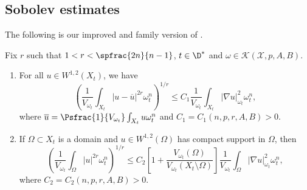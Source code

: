 \subsection{Sobolev estimates} \label{sec:sobolev}

The following is our improved and family version of \cite[Th.\,2.1 \& Lem.\,6.2]{GPSS23}.

\begin{theorem} \label{thm:sobolev}
Fix $r$ such that $1<r< \spfrac{2n}{n-1}$, $t \in \D^*$ and $\omega \in {\mathcal K}(\mathcal{X},p,A,B)$.
\begin{enumerate}
\item
For all $u\in W^{1,2}(X_t)$, we have
\[
\left(\frac{1}{V_{\omega_t}} \int_{X_t} |u-\overline{u}|^{2r}\omega_t^n\right)^{1/r}
\leq C_1\frac{1}{V_{\omega_t}} \int_{X_t} |\nabla u|^2_{\omega_t} \omega_t^n,
\]
where $\overline u= \Psfrac{1}{V_{\omega_t}}\int_{X_t} u \omega_t^n$ and $C_1=C_1(n,p,r,A,B)>0$.

\item
If $\Omega \subset X_t$ is a domain and $u\in W^{1,2}(\Omega)$
has compact support in $\Omega$, then
\[
\left( \frac{1}{V_{\omega_t}} \int_{\Omega} |u|^{2r}\omega_t^n \right)^{1/r}
\leq C_2 \left[1+ \frac{V_{\omega_t}(\Omega)}{V_{\omega_t}(X_t \setminus \Omega)} \right]
\frac{1}{V_{\omega_t}} \int_{\Omega} |\nabla u|^2_{\omega_t} \omega_t^n,
\]
where $C_2=C_2(n,p,r,A,B)>0$.
\end{enumerate}
\end{theorem}

